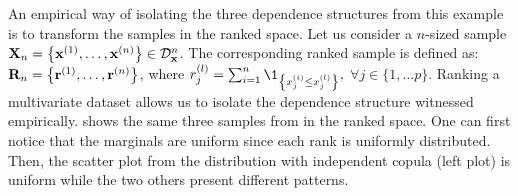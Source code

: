 An empirical way of isolating the three dependence structures from this example is to transform the samples in the ranked space. 
Let us consider a $n$-sized sample ${\bf X}_n = \left\{{\bf x}^{(1)}, \dots, {\bf x}^{(n)}\right\} \in \mathcal{D}_{{\bf x}}^{n}$. 
The corresponding ranked sample is defined as: ${\bf R}_n = \left\{{\bf r}^{(1)}, \dots, {\bf r}^{(n)}\right\}$, 
where $r^{(l)}_j = \sum_{i=1}^n \1_{\left\{x^{(i)}_j \leq x^{(l)}_j\right\}},$ $\forall j \in \{1, \dots p\}$.
Ranking a multivariate dataset allows us to isolate the dependence structure witnessed empirically. 
 shows the same three samples from  in the ranked space.
One can first notice that the marginals are uniform since each rank is uniformly distributed. 
Then, the scatter plot from the distribution with independent copula (left plot) is uniform while the two others present different patterns. 
